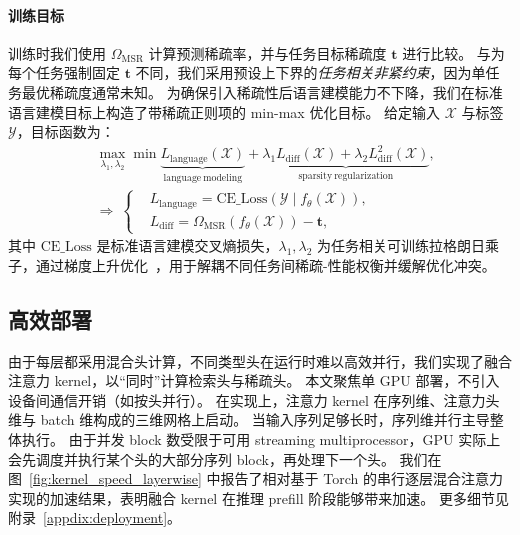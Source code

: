 \paragraph{训练目标}
训练时我们使用 $\Omega_{\mathrm{MSR}}$ 计算预测稀疏率，并与任务目标稀疏度 $\boldsymbol{t}$ 进行比较。
与为每个任务强制固定 $\boldsymbol{t}$ 不同，我们采用预设上下界的\emph{任务相关非紧约束}，因为单任务最优稀疏度通常未知。
为确保引入稀疏性后语言建模能力不下降，我们在标准语言建模目标上构造了带稀疏正则项的 min-max 优化目标。
给定输入 $\mathcal{X}$ 与标签 $\mathcal{Y}$，目标函数为：
\begin{equation}
\begin{aligned}
& \max_{\lambda_1, \lambda_2} \min \underbrace{L_{\mathrm{language}}(\mathcal{X})}_{\mathrm{language~modeling}} + \underbrace{\lambda_1 L_{\mathrm{diff}}(\mathcal{X}) + \lambda_2 L_{\mathrm{diff}}^{2}(\mathcal{X})}_{\mathrm{sparsity~regularization}}, \\
& \Rightarrow~\left\{
\begin{aligned}
& L_{\mathrm{language}} = \mathrm{CE\_Loss}\left(\mathcal{Y}\mid f_{\theta}(\mathcal{X})\right),\\
& L_{\mathrm{diff}} = \Omega_{\mathrm{MSR}}\left(f_\theta(\mathcal{X})\right) - \boldsymbol{t}, \
\end{aligned}
\right.
\end{aligned}
\label{equ:training_ojective}
\end{equation}
其中 $\mathrm{CE\_Loss}$ 是标准语言建模交叉熵损失，$\lambda_1, \lambda_2$ 为任务相关可训练拉格朗日乘子，通过梯度上升优化~\citep{bhaskar2025cache}，用于解耦不同任务间稀疏-性能权衡并缓解优化冲突。


\subsection{高效部署}
\label{subsec:deployment_of_attn_router}
由于每层都采用混合头计算，不同类型头在运行时难以高效并行，我们实现了融合注意力 kernel，以“同时”计算检索头与稀疏头。
本文聚焦单 GPU 部署，不引入设备间通信开销（如按头并行）。
在实现上，注意力 kernel 在序列维、注意力头维与 batch 维构成的三维网格上启动。
当输入序列足够长时，序列维并行主导整体执行。
由于并发 block 数受限于可用 streaming multiprocessor，GPU 实际上会先调度并执行某个头的大部分序列 block，再处理下一个头。
我们在图~\ref{fig:kernel_speed_layerwise} 中报告了相对基于 Torch 的串行逐层混合注意力实现的加速结果，表明融合 kernel 在推理 prefill 阶段能够带来加速。
更多细节见附录~\ref{appdix:deployment}。

